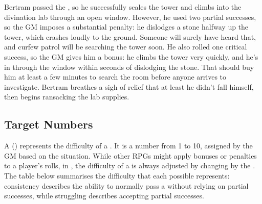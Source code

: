 Bertram passed the {\test}, so he successfully scales the tower and climbs into the divination lab through an open window.
However, he used two partial successes, so the GM imposes a substantial penalty: he dislodges a stone halfway up the tower, which crashes loudly to the ground.
Someone will surely have heard that, and curfew patrol will be searching the tower soon.
He also rolled one critical success, so the GM gives him a bonus: he climbs the tower very quickly, and he's in through the window within seconds of dislodging the stone.
That should buy him at least a few minutes to search the room before anyone arrives to investigate.
Bertram breathes a sigh of relief that at least he didn't fall himself, then begins ransacking the lab supplies.

\subsection{Target Numbers}

A {\targetnumber} ({\tn}) represents the difficulty of a {\test}.
It is a number from 1 to 10, assigned by the GM based on the situation.
While other RPGs might apply bonuses or penalties to a player's rolls, in , the difficulty of a {\test} is always adjusted by changing by the {\tn}.
The table below summarises the difficulty that each possible {\tn} represents: consistency describes the ability to normally pass a {\test} without relying on partial successes, while struggling describes accepting partial successes.


